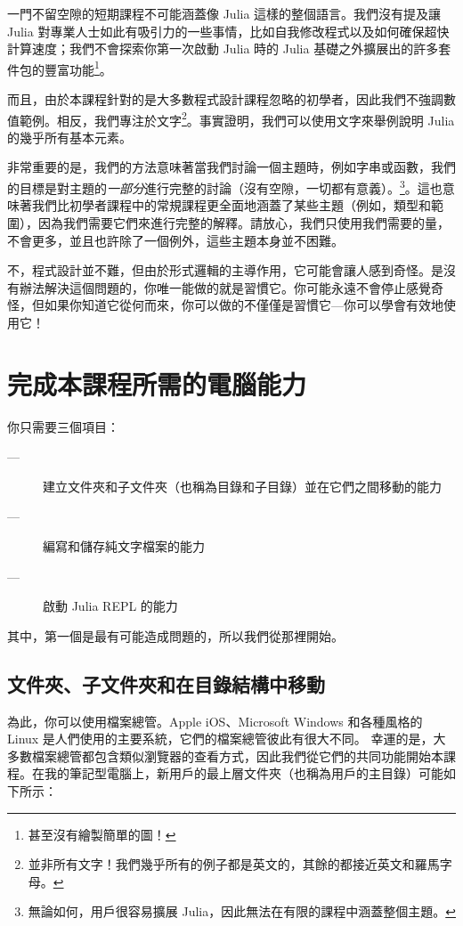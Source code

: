 \documentclass[]{article}
\begin{document}
一門不留空隙的短期課程不可能涵蓋像 Julia 這樣的整個語言。我們沒有提及讓 Julia 對專業人士如此有吸引力的一些事情，比如自我修改程式以及如何確保超快計算速度；我們不會探索你第一次啟動 Julia 時的 Julia 基礎之外擴展出的許多套件包的豐富功能\footnote{甚至沒有繪製簡單的圖！}。

而且，由於本課程針對的是大多數程式設計課程忽略的初學者，因此我們不強調數值範例。相反，我們專注於文字\footnote{並非所有文字！我們幾乎所有的例子都是英文的，其餘的都接近英文和羅馬字母。}。事實證明，我們可以使用文字來舉例說明 Julia 的幾乎所有基本元素。

非常重要的是，我們的方法意味著當我們討論一個主題時，例如字串或函數，我們的目標是對主題的\emph{一部分}進行完整的討論（沒有空隙，一切都有意義）。\footnote{無論如何，用戶很容易擴展 Julia，因此無法在有限的課程中涵蓋整個主題。}。這也意味著我們比初學者課程中的常規課程更全面地涵蓋了某些主題（例如，類型和範圍），因為我們需要它們來進行完整的解釋。請放心，我們只使用我們需要的量，不會更多，並且也許除了一個例外，這些主題本身並不困難。

不，程式設計並不難，但由於形式邏輯的主導作用，它可能會讓人感到奇怪。是沒有辦法解決這個問題的，你唯一能做的就是習慣它。你可能永遠不會停止感覺奇怪，但如果你知道它從何而來，你可以做的不僅僅是習慣它---你可以學會有效地使用它！

\section*{完成本課程所需的電腦能力}

你只需要三個項目：

\begin{description}
	\item[---] 建立文件夾和子文件夾（也稱為目錄和子目錄）並在它們之間移動的能力
	\item[---] 編寫和儲存純文字檔案的能力
	\item[---] 啟動 Julia REPL 的能力
\end{description}

其中，第一個是最有可能造成問題的，所以我們從那裡開始。

\subsection*{文件夾、子文件夾和在目錄結構中移動}

為此，你可以使用檔案總管。Apple iOS、Microsoft Windows 和各種風格的 Linux 是人們使用的主要系統，它們的檔案總管彼此有很大不同。
幸運的是，大多數檔案總管都包含類似瀏覽器的查看方式，因此我們從它們的共同功能開始本課程。在我的筆記型電腦上，新用戶的最上層文件夾（也稱為用戶的主目錄）可能如下所示：
\end{document}
